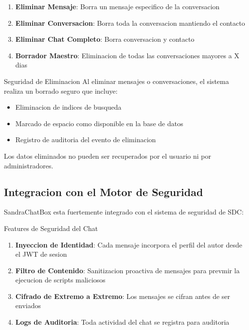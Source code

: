 \begin{enumerate}
    \item \textbf{Eliminar Mensaje}: Borra un mensaje especifico de la conversacion
    \item \textbf{Eliminar Conversacion}: Borra toda la conversacion mantiendo el contacto
    \item \textbf{Eliminar Chat Completo}: Borra conversacion y contacto
    \item \textbf{Borrador Maestro}: Eliminacion de todas las conversaciones mayores a X dias
\end{enumerate}

\begin{caja}{Seguridad de Eliminacion}
Al eliminar mensajes o conversaciones, el sistema realiza un borrado seguro que incluye:
\begin{itemize}
    \item Eliminacion de indices de busqueda
    \item Marcado de espacio como disponible en la base de datos
    \item Registro de auditoria del evento de eliminacion
\end{itemize}
Los datos eliminados no pueden ser recuperados por el usuario ni por administradores.
\end{caja}


\subsection{Integracion con el Motor de Seguridad}

SandraChatBox esta fuertemente integrado con el sistema de seguridad de SDC:

\begin{caja}{Features de Seguridad del Chat}
\begin{enumerate}
    \item \textbf{Inyeccion de Identidad}: Cada mensaje incorpora el perfil del autor desde el JWT de sesion
    \item \textbf{Filtro de Contenido}: Sanitizacion proactiva de mensajes para prevmir la ejecucion de scripts maliciosos
    \item \textbf{Cifrado de Extremo a Extremo}: Los mensajes se cifran antes de ser enviados
    \item \textbf{Logs de Auditoria}: Toda actividad del chat se registra para auditoria
\end{enumerate}
\end{caja}


